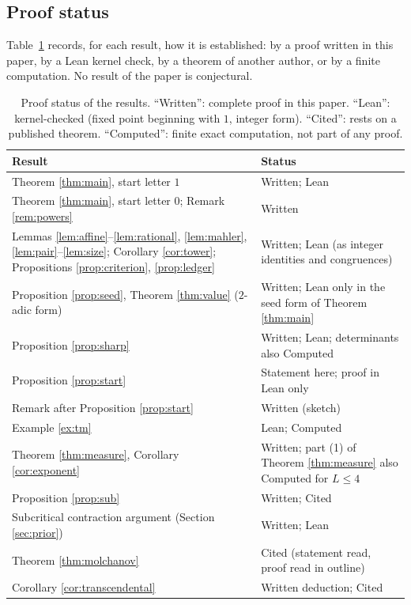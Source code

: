 \documentclass[11pt,reqno]{amsart}
\theoremstyle{definition}
\theoremstyle{remark}
\begin{document}
\subsection{Proof status}
Table~\ref{tab:status} records, for each result, how it is established:
by a proof written in this paper, by a Lean kernel check, by a theorem of
another author, or by a finite computation.  No result of the paper is
conjectural.

\begin{table}[ht]
\caption{Proof status of the results.  ``Written'': complete proof in this
paper.  ``Lean'': kernel-checked (fixed point beginning with $1$, integer
form).  ``Cited'': rests on a published theorem.  ``Computed'': finite
exact computation, not part of any proof.}\label{tab:status}
\small
\begin{tabular}{@{}p{}p{}@{}}
\toprule
Result & Status \\
\midrule
Theorem \ref{thm:main}, start letter $1$ & Written; Lean \\
Theorem \ref{thm:main}, start letter $0$; Remark \ref{rem:powers} & Written \\
Lemmas \ref{lem:affine}--\ref{lem:rational}, \ref{lem:mahler}, \ref{lem:pair}--\ref{lem:size}; Corollary \ref{cor:tower}; Propositions \ref{prop:criterion}, \ref{prop:ledger} & Written; Lean (as integer identities and congruences) \\
Proposition \ref{prop:seed}, Theorem \ref{thm:value} ($2$-adic form) & Written; Lean only in the seed form of Theorem \ref{thm:main} \\
Proposition \ref{prop:sharp} & Written; Lean; determinants also Computed \\
Proposition \ref{prop:start} & Statement here; proof in Lean only \\
Remark after Proposition \ref{prop:start} & Written (sketch) \\
Example \ref{ex:tm} & Lean; Computed \\
Theorem \ref{thm:measure}, Corollary \ref{cor:exponent} & Written; part (1) of Theorem \ref{thm:measure} also Computed for $L\le 4$ \\
Proposition \ref{prop:sub} & Written; Cited \cite{MonksYazinski2004} \\
Subcritical contraction argument (Section \ref{sec:prior}) & Written; Lean \\
Theorem \ref{thm:molchanov} & Cited \cite{Molchanov1983} (statement read, proof read in outline) \\
Corollary \ref{cor:transcendental} & Written deduction; Cited \cite{Molchanov1983,Fatou1906} \\
\bottomrule
\end{tabular}
\end{table}
\end{document}
